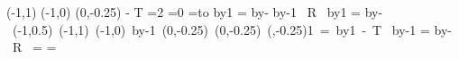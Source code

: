 {{{                \oplput(-1,1){\op@subsymbol}%
              \else
                \oplput(-1,0){\op@subsymbol}%
              \fi\fi
              \ophline(0,-0.25){}%
              \kern-\count@v\opcolumnwidth
              \kern\count@iii\opcolumnwidth
                         {T\the\count@iv}%
            }%
          \else
            \ifnum{}=2
              \ifnum{}=0
                =\hbox to%
              \fi
            \fi
          \fi
          \advance\count@ii by1\relax
        \else
          \count@v=\count@i
          \advance\count@v by-%
          \relax\else
            \advance\count@v by-1
          \fi
          \hbox{%
            \kern\count@v\opcolumnwidth{}
                       {R\the\count@ii}%
          }%
          \advance\count@ii by1\relax
          \ifx\op@displayintermediary\op@string@none
          \else
            \count@iii=\count@i
            \advance\count@iii by-%
            \hbox{%
              \kern\count@v\opcolumnwidth
              \ifx\op@voperator\op@string@center
                \oplput(-1,0.5){\op@subsymbol}%
              \else\ifx\op@voperator\op@string@top
                \oplput(-1,1){\op@subsymbol}%
              \else
                \oplput(-1,0){\op@subsymbol}%
              \fi\fi
              \advance\count@ii by-1
              \relax
                \ophline(0,-0.25){}%
              \else
                \ophline(0,-0.25){}%
                \ophline(,-0.25){1}%
                {=}%
              \fi
              \advance\count@ii by1
              \kern-\count@v\opcolumnwidth
              \kern\count@iii\opcolumnwidth
                         {T\the\count@iv}%
            }%
          \fi
        \fi
      \repeat
      \advance\count@i by-1
      \count@iii=\count@i
      \advance\count@iii by-%
      \hbox{%
        \kern\count@iii\opcolumnwidth
                   {R\the\count@ii}%
      }%
    }%
    =\vbox{%
      \count@v=\op@max{\OP@qq@w}{\OP@b@w}
}}

